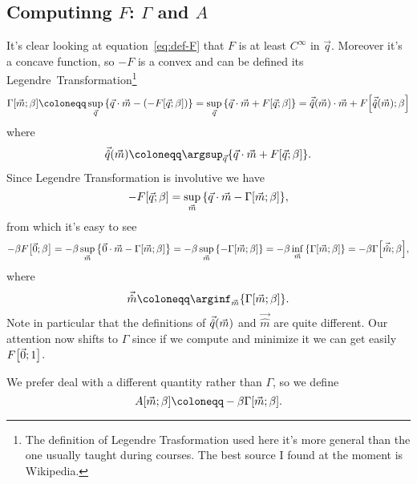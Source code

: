 \subsection[Computing F: \textGamma and A]{Computinng \(F\): \(\Gamma\) and \(A\)}
It's clear looking at equation~\eqref{eq:def-F} that \(F\) is at least \(C^\infty\)
in \(\vec{q}\). Moreover it's a concave function, so \(-F\) is a convex and can be
defined its Legendre~Transformation\footnote{The definition of Legendre Trasformation
  used here it's more general than the one usually taught during courses. The best
  source I found at the moment is Wikipedia.}
\begin{equation}
  \Gam{\vec{m}}{\beta} \coloneqq \sup_{\vec{q}}{\left\{\vec{q}\cdot\vec{m}
                            - \left(-\FEn{\vec{q}}{\beta}\right)\right\}}
                       = \sup_{\vec{q}}{\left\{\vec{q}\cdot\vec{m}
                            + \FEn{\vec{q}}{\beta}\right\}}
                       = \qhat{\vec{m}}\cdot\vec{m} + \FEn{\qhat{\vec{m}}}{\beta}
\end{equation}
where
\[
  \qhat{\vec{m}} \coloneqq
  \argsup_{\vec{q}}{\left\{\vec{q}\cdot\vec{m} + \FEn{\vec{q}}{\beta}\right\}}.
\]
Since Legendre Transformation is involutive we have
\[
  -F{\left[\vec{q};\beta\right]} = \sup_{\vec{m}}{\left\{\vec{q}\cdot\vec{m} - \Gamma{\left[\vec{m};\beta\right]}\right\}},
\]
from which it's easy to see
\begin{equation*}
  -\beta F{\left[\vec{0};\beta\right]} = -\beta \sup_{\vec{m}}{\left\{\vec{0}\cdot\vec{m} -
                                                             \Gamma{\left[\vec{m};\beta\right]}\right\}}
                              = -\beta \sup_{\vec{m}}{\left\{-\Gamma{\left[\vec{m};\beta\right]}\right\}}
                              = -\beta \inf_{\vec{m}}{\left\{\Gamma{\left[\vec{m};\beta\right]}\right\}}
                              = -\beta \Gamma{\left[\vec{\hat{m}};\beta\right]},
\end{equation*}
where 
\[
  \vec{\hat{m}} \coloneqq
  \arginf_{\vec{m}}{\left\{\Gam{\vec{m}}{\beta}\right\}}.
\]
Note in particular that the definitions of \(\vec{\hat{q}}{(\vec{m})}\) and \(\vec{\hat{m}}\) are quite
different. Our attention now shifts to \(\Gamma\) since if we compute and minimize it we
can get easily \(F{\left[\vec{0};1\right]}\).

We prefer deal with a different quantity rather than \(\Gamma\), so we define
\[
  A{\left[\vec{m};\beta\right]} \coloneqq -\beta \Gam{\vec{m}}{\beta}.
\]


